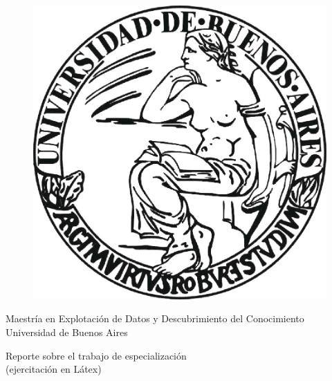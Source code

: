 \documentclass[10 pt]{article}
\begin{document}
\begin{titlepage}

\begin{center}
\vspace*{-0.5in}
\begin{figure}[htb]
\begin{center}
\includegraphics[scale=.3]{imagenes/uba2.jpg}
\end{center}
\end{figure}

\begin{large}
Maestría en Explotación de Datos y Descubrimiento del Conocimiento\\
\vspace*{0.15in}
Universidad de Buenos Aires \\

\vspace*{0.6in}
\end{large}

\begin{large}
Reporte sobre el trabajo de especialización\\
(ejercitación en Látex)\\

\end{large}
\vspace*{0.2in}
\vspace*{0.3in}


\end{center}
\end{titlepage}
\end{document}
